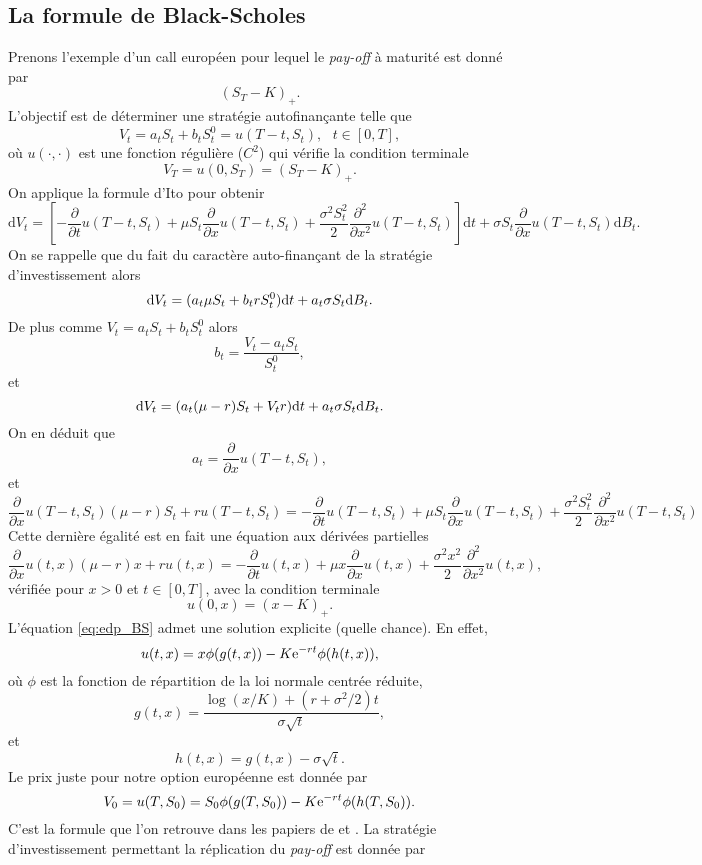 \subsection{La formule de Black-Scholes}
Prenons l'exemple d'un call européen pour lequel le \textit{pay-off} à maturité est donné par 
$$
(S_T-K)_+.
$$
L'objectif est de déterminer une stratégie autofinançante telle que 
$$
V_t = a_t S_t + b_t S^0_t = u(T-t, S_t),\text{ }t\in [0, T],
$$
où $u(\cdot, \cdot)$ est une fonction régulière ($C^2$) qui vérifie la condition terminale 
$$
V_T = u(0,S_T) = (S_T-K)_+.
$$
On applique la formule d'Ito pour obtenir 
$$
\text{d}V_t = \left[-\frac{\partial}{\partial t}u(T-t, S_t) + \mu S_t\frac{\partial}{\partial x}u(T-t, S_t) + \frac{\sigma^2 S_t^2}{2}\frac{\partial^2}{\partial x^2}u(T-t, S_t)\right]\text{d}t + \sigma S_t\frac{\partial}{\partial x}u(T-t, S_t)\text{d}B_t.
$$
On se rappelle que du fait du caractère auto-finançant de la stratégie d'investissement alors
$$
\text{d} V_t = (a_t\mu S_t + b_tr S_t^0)\text{d} t  + a_t \sigma S_t \text{d} B_t.
$$
De plus comme $V_t = a_t S_t + b_t S^0_t$ alors 
$$
b_t = \frac{V_t - a_t S_t}{S^0_t},
$$
et 
$$
\text{d} V_t = (a_t(\mu - r)S_t + V_t r )\text{d} t  + a_t \sigma S_t \text{d} B_t.
$$
On en déduit que 
$$
a_t = \frac{\partial}{\partial x}u(T-t, S_t),
$$
et 
\begin{equation*}
\frac{\partial}{\partial x}u(T-t, S_t)(\mu - r)S_t + r u(T-t, S_t) = -\frac{\partial}{\partial t}u(T-t, S_t) + \mu S_t\frac{\partial}{\partial x}u(T-t, S_t) + \frac{\sigma^2 S_t^2}{2}\frac{\partial^2}{\partial x^2}u(T-t, S_t)
\end{equation*}
Cette dernière égalité est en fait une équation aux dérivées partielles
\begin{equation}\label{eq:edp_BS}
\frac{\partial}{\partial x}u(t, x)(\mu - r)x + r u(t, x) = -\frac{\partial}{\partial t}u(t, x) + \mu x\frac{\partial}{\partial x}u(t, x) + \frac{\sigma^2 x^2}{2}\frac{\partial^2}{\partial x^2}u(t, x),
\end{equation}
vérifiée pour $x>0$ et $t\in[0,T]$, avec la condition terminale 
$$
u(0,x) = (x-K)_+.
$$
L'équation \eqref{eq:edp_BS} admet une solution explicite (quelle chance). En effet, 
$$
u(t,x) = x\phi(g(t,x)) - K\mathrm{e}^{-rt}\phi(h(t,x)),
$$
où $\phi$ est la fonction de répartition de la loi normale centrée réduite, 
$$
g(t,x) = \frac{\log(x/K) + (r+\sigma^2/2)t}{\sigma \sqrt{t}},
$$
et 
$$
h(t,x) = g(t,x) - \sigma\sqrt{t}.
$$
Le prix juste pour notre option européenne est donnée par 
$$
V_0 = u(T, S_0) = S_0\phi(g(T,S_0)) - K\mathrm{e}^{-rt}\phi(h(T,S_0)).
$$
C'est la formule que l'on retrouve dans les papiers de \citet{Black1973} et \citet{Merton1973}. La stratégie d'investissement permettant la réplication du \textit{pay-off} est donnée par 
